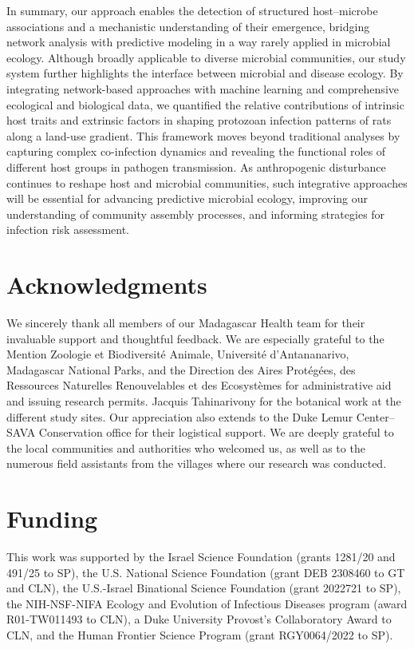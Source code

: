 \documentclass[oneside, a4paper, onecolumn, 11pt]{article}
\begin{document}
In summary, our approach enables the detection of structured host–microbe associations and a mechanistic understanding of their emergence, bridging network analysis with predictive modeling in a way rarely applied in microbial ecology. Although broadly applicable to diverse microbial communities, our study system further highlights the interface between microbial and disease ecology. By integrating network-based approaches with machine learning and comprehensive ecological and biological data, we quantified the relative contributions of intrinsic host traits and extrinsic factors in shaping protozoan infection patterns of rats along a land-use gradient. This framework moves beyond traditional analyses by capturing complex co-infection dynamics and revealing the functional roles of different host groups in pathogen transmission. As anthropogenic disturbance continues to reshape host and microbial communities, such integrative approaches will be essential for advancing predictive microbial ecology, improving our understanding of community assembly processes, and informing strategies for infection risk assessment.

\vspace{6 mm}
\section*{Acknowledgments}
We sincerely thank all members of our Madagascar Health team for their invaluable support and thoughtful feedback. We are especially grateful to the Mention Zoologie et Biodiversité Animale, Université d'Antananarivo, Madagascar National Parks, and the Direction des Aires Protégées, des Ressources Naturelles Renouvelables et des Ecosystèmes for administrative aid and issuing research permits. Jacquis Tahinarivony for the botanical work at the different study sites. Our appreciation also extends to the Duke Lemur Center–SAVA Conservation office for their logistical support. We are deeply grateful to the local communities and authorities who welcomed us, as well as to the numerous field assistants from the villages where our research was conducted.

\section*{Funding}
This work was supported by the Israel Science Foundation (grants 1281/20 and 491/25 to SP), the U.S. National Science Foundation (grant DEB 2308460 to GT and CLN), the U.S.-Israel Binational Science Foundation (grant 2022721 to SP), the NIH-NSF-NIFA Ecology and Evolution of Infectious Diseases program (award R01-TW011493 to CLN), a Duke University Provost’s Collaboratory Award to CLN, and the Human Frontier Science Program (grant RGY0064/2022 to SP).
\end{document}
